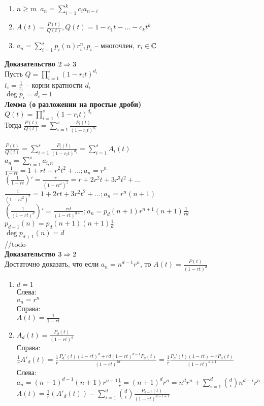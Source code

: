 \documentclass[12pt]{article}
\begin{document}
\begin{enumerate}
    \item $n \geq m$\ $a_n = \sum_{i=1}^k c_i a_{n-i}$
    \item $A(t) = \frac{P(t)}{Q(t)}, Q(t) = 1-c_1t-\ldots-c_kt^k$
    \item $a_n = \sum_{i=1}^s p_i(n) r_i^n, p_i$ -- многочлен, $r_i \in \mathbb{C}$
\end{enumerate}
\textbf{Доказательство $2 \Rightarrow 3$}\\
Пусть $Q = \prod_{i=1}^{s}(1-r_it)^{d_i}$\\
$t_i=\frac{1}{r_i}$ -- корни кратности $d_i$\\
$\deg p_i = d_i-1$\\
\textbf{Лемма (о разложении на простые дроби)}\\
$Q(t) = \prod_{i=1}^{s} (1-r_it)^{d_i}$\\
Тогда $\frac{P(t)}{Q(t)} = \sum_{i=1}^s \frac{P_i(t)}{(1-r_it)^{d_i}}$\\\\
$\frac{P(t)}{Q(t)} = \sum_{i=1}^s \frac{P_i(t)}{(1-r_it)^{d_i}} = \sum_{i=1}^s A_i(t)$\\
$a_n = \sum_{i=1}^s a_{i,n}$\\
$\frac1{1-rt} = 1 + rt + r^2t^2 + \ldots; a_n=r^n$\\
$(\frac1{1-rt})' = \frac{r}{(1-rt^2)^2} = r+2r^2t+3r^3t^2+\ldots$\\
$\frac{1}{(1-rt^2)^2} = 1+2rt+3r^2t^2+\ldots; a_n = r^n(n+1)$\\
$(\frac1{(1-rt)^d})' = \frac{rd}{(1-rt)^{d+1}}; a_n = p_d(n+1)r^{n+1}(n+1)\frac{1}{rd}$\\
$p_{d+1}(n) = p_d(n+1)(n+1)\frac{1}{d}$\\
$\deg p_{d+1}(n) = d$\\
//todo\\
\textbf{Доказательство $3\Rightarrow 2$}\\
Достаточно доказать, что если $a_n = n^{d-1}r^n$, то $A(t) = \frac{P(t)}{(1-rt)^d}$\\
\begin{enumerate}
    \item $d=1$\\
    Слева:\\
    $a_n = r^n$\\
    Справа:\\
    $A(t) = \frac{1}{1-rt}$
    \item $A_d(t) = \frac{P_d(t)}{(1-rt)^d}$\\
    Справа:\\
    $\frac1rA'_d(t) = \frac1r\frac{P_d'(t)(1-rt)^d+rd(1-rt)^{d-1}P_d(t)}{(1-rt)^{2d}} = \frac1r\frac{P_d'(t)(1-rt)+rP_d(t)}{(1-rt)^{d+1}}$\\
    Слева:\\
    $a_n = (n+1)^{d-1}(n+1)r^{n+1}\frac1r=(n+1)^dr^{n}=n^dr^n + \sum_{i=1}^d \binom{d}{i}n^{d-i}r^n$\\
    $A(t) = \frac{1}{r}(A'_d(t)) - \sum_{i=1}^d\binom{d}{i}\frac{P_{d-i}(t)}{(1-rt)^{d-i+1}}$
\end{enumerate}
\end{document}
